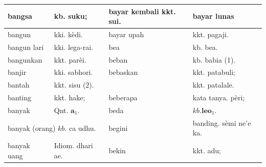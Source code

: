 \documentclass[10pt]{article}
\begin{document}
\begin{center}
\begin{tabular}{|l|l|l|l|}
\hline
bangsa & kb. suku; & bayar kembali kkt. sui. & bayar lunas \\
\hline
bangun & kki. kèdi. & bayar upah & kkt. pagaji. \\
\hline
bangun lari & kki. lega-rai. & bea & kb. bea. \\
\hline
bangunkan & kkt. parèi. & beban & kb. babia (1). \\
\hline
banjir & kki. sabhori. & bebaskan & kkt. patabuli; \\
\hline
bantah & kkt. sisu (2). &  & kkt. patalale. \\
\hline
banting & kkt. hake; & beberapa & kata tanya. pèri; \\
\hline
banyak & Qnt. \(\boldsymbol{a}_{1}\). & beda & \(k b . \mathbf{l e o}_{1}\). \\
\hline
\multicolumn{2}{|l|}{banyak (orang) \(k b\). ca udhu.} & begini & banding. sèmi ne'e ka. \\
\hline
banyak uang & Idiom. dhari ae. & bekin & kkt. adu; \\
\hline
\end{tabular}
\end{center}
\end{document}
